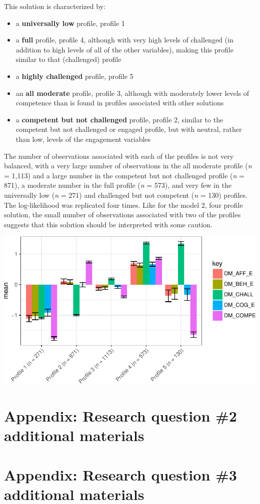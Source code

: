 \documentclass[]{msu-thesis}
\providecommand{\tightlist}{%
  \setlength{\itemsep}{0pt}\setlength{\parskip}{0pt}}
\theoremstyle{definition}
\theoremstyle{definition}
\theoremstyle{definition}
\theoremstyle{remark}
\begin{document}
This solution is characterized by:

\begin{itemize}
\tightlist
\item
  a \textbf{universally low} profile, profile 1
\item
  a \textbf{full} profile, profile 4, although with very high levels of
  challenged (in addition to high levels of all of the other variables),
  making this profile similar to that (challenged) profile
\item
  a \textbf{highly challenged} profile, profile 5
\item
  an \textbf{all moderate} profile, profile 3, although with moderately
  lower levels of competence than is found in profiles associated with
  other solutions
\item
  a \textbf{competent but not challenged} profile, profile 2, similar to
  the competent but not challenged or engaged profile, but with neutral,
  rather than low, levels of the engagement variables
\end{itemize}

The number of observations associated with each of the profiles is not
very balanced, with a very large number of observations in the all
moderate profile (\emph{n} = 1,113) and a large number in the competent
but not challenged profile (\emph{n} = 871), a moderate number in the
full profile (\emph{n} = 573), and very few in the universally low
(\emph{n} = 271) and challenged but not competent (\emph{n} = 130)
profiles. The log-likelihood was replicated four times. Like for the
model 2, four profile solution, the small number of observations
associated with two of the profiles suggests that this solution should
be interpreted with some caution.

\begin{center}\includegraphics[width=0.8\linewidth]{rosenberg-dissertation_files/figure-latex/m2_5p-1} \end{center}

\section{Appendix: Research question \#2 additional
materials}\label{appendix-research-question-2-additional-materials}

\section{Appendix: Research question \#3 additional
materials}\label{appendix-research-question-3-additional-materials}


\end{document}
